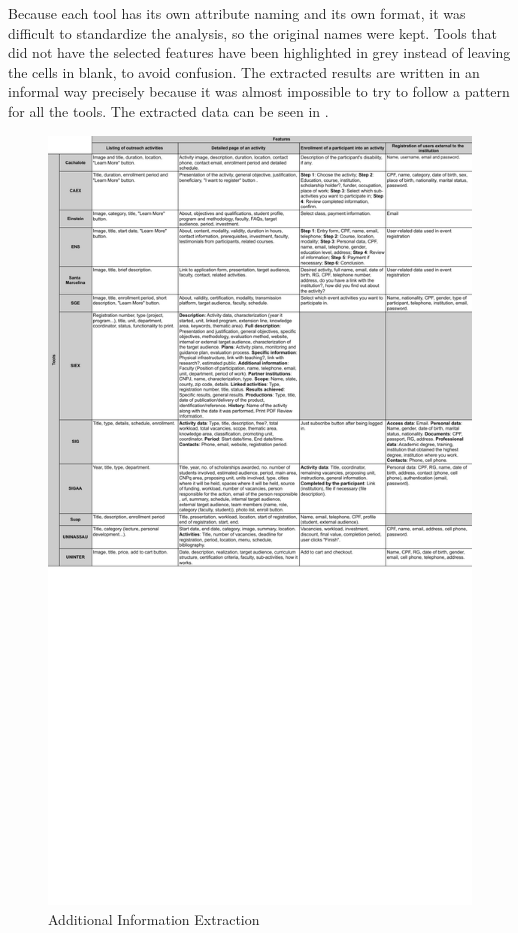 Because each tool has its own attribute naming and its own format, it was difficult to standardize the analysis, so the original names were kept. Tools that did not have the selected features have been highlighted in grey instead of leaving the cells in blank, to avoid confusion. The extracted results are written in an informal way precisely because it was almost impossible to try to follow a pattern for all the tools. The extracted data can be seen in .

\begin{figure}[!htb]
  \caption{Additional Information Extraction}\label{fig:gl-additional-extraction}
  \begin{center}
    \includegraphics[width=16cm]{img/gl-data-extraction-2.pdf}
  \end{center}
\end{figure}

